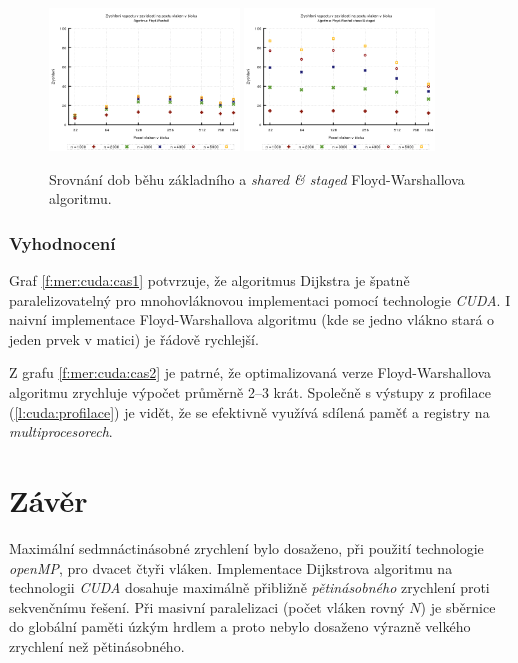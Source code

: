 \begin{figure}
    \centering
    \includegraphics[width=0.45\textwidth]{../grafy/03_cuda/03-02-Floyd_v1_zrychleni_unzoom}
    \includegraphics[width=0.45\textwidth]{../grafy/03_cuda/03-02-Floyd_v2_zrychleni}
    \caption{Srovnání dob běhu základního a \emph{shared \& staged} Floyd-Warshallova algoritmu.}
    \label{f:mer:cuda:zrychleni2}
\end{figure}


\subsubsection{Vyhodnocení}
Graf \ref{f:mer:cuda:cas1} potvrzuje, že algoritmus Dijkstra je špatně paralelizovatelný pro mnohovláknovou implementaci pomocí technologie \emph{CUDA}. I naivní implementace Floyd-Warshallova algoritmu (kde se jedno vlákno stará o jeden prvek v matici) je řádově rychlejší.

Z grafu \ref{f:mer:cuda:cas2} je patrné, že optimalizovaná verze Floyd-Warshallova algoritmu zrychluje výpočet průměrně 2--3 krát. Společně s výstupy z profilace (\ref{l:cuda:profilace}) je vidět, že se efektivně využívá sdílená paměť a registry na \emph{multiprocesorech}. 



\section{Závěr}
Maximální sedmnáctinásobné zrychlení bylo dosaženo, při použití technologie \emph{openMP}, pro dvacet čtyři vláken.
Implementace Dijkstrova algoritmu na technologii \emph{CUDA} dosahuje maximálně přibližně \emph{pětinásobného} zrychlení proti sekvenčnímu řešení. Při masivní paralelizaci (počet vláken rovný $N$) je sběrnice do globální paměti úzkým hrdlem a proto nebylo dosaženo výrazně velkého zrychlení než pětinásobného. 


